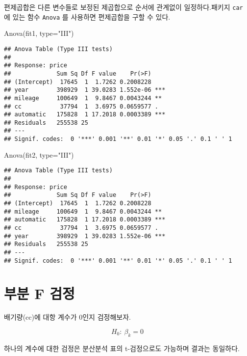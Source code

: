 \documentclass[
]{book}
\newenvironment{Shaded}{\begin{snugshade}}{\end{snugshade}}
\newcommand{\AttributeTok}[1]{\textcolor[rgb]{0.77,0.63,0.00}{#1}}
\newcommand{\FunctionTok}[1]{\textcolor[rgb]{0.00,0.00,0.00}{#1}}
\newcommand{\NormalTok}[1]{#1}
\newcommand{\StringTok}[1]{\textcolor[rgb]{0.31,0.60,0.02}{#1}}
\begin{document}
편제곱합은 다른 변수들로 보정된 제곱합으로 순서에 관계없이 일정하다.패키지 \texttt{car} 에 있는 함수 \texttt{Anova} 를 사용하면
편제곱합을 구할 수 있다.

\begin{Shaded}
\begin{Highlighting}[]
\FunctionTok{Anova}\NormalTok{(fit1, }\AttributeTok{type=}\StringTok{"III"}\NormalTok{)}
\end{Highlighting}
\end{Shaded}

\begin{verbatim}
## Anova Table (Type III tests)
## 
## Response: price
##             Sum Sq Df F value    Pr(>F)    
## (Intercept)  17645  1  1.7262 0.2008228    
## year        398929  1 39.0283 1.552e-06 ***
## mileage     100649  1  9.8467 0.0043244 ** 
## cc           37794  1  3.6975 0.0659577 .  
## automatic   175828  1 17.2018 0.0003389 ***
## Residuals   255538 25                      
## ---
## Signif. codes:  0 '***' 0.001 '**' 0.01 '*' 0.05 '.' 0.1 ' ' 1
\end{verbatim}

\begin{Shaded}
\begin{Highlighting}[]
\FunctionTok{Anova}\NormalTok{(fit2, }\AttributeTok{type=}\StringTok{"III"}\NormalTok{)}
\end{Highlighting}
\end{Shaded}

\begin{verbatim}
## Anova Table (Type III tests)
## 
## Response: price
##             Sum Sq Df F value    Pr(>F)    
## (Intercept)  17645  1  1.7262 0.2008228    
## mileage     100649  1  9.8467 0.0043244 ** 
## automatic   175828  1 17.2018 0.0003389 ***
## cc           37794  1  3.6975 0.0659577 .  
## year        398929  1 39.0283 1.552e-06 ***
## Residuals   255538 25                      
## ---
## Signif. codes:  0 '***' 0.001 '**' 0.01 '*' 0.05 '.' 0.1 ' ' 1
\end{verbatim}

\hypertarget{uxbd80uxbd84-f-uxac80uxc815}{%
\section{부분 F 검정}\label{uxbd80uxbd84-f-uxac80uxc815}}

배기량(cc)에 대항 계수가 0인지 검정해보자.

\[ H_0: ~ \beta_k =0 \]

하나의 계수에 대한 검정은 분산분석 표의 t-검정으로도 가능하며 결과는 동일하다.
\end{document}
